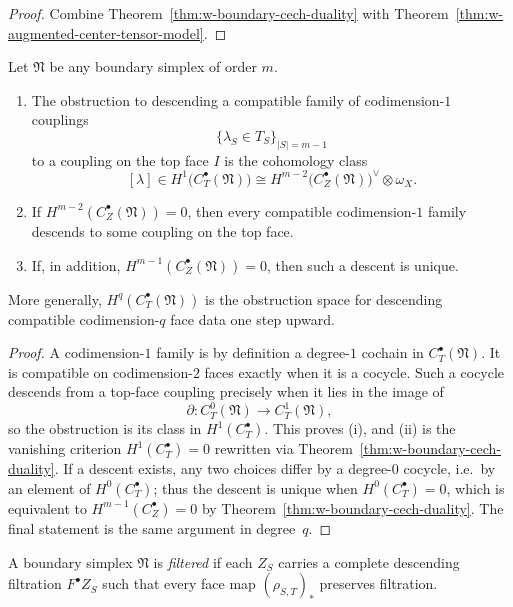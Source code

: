 \begin{proof}
Combine Theorem~\ref{thm:w-boundary-cech-duality} with
Theorem~\ref{thm:w-augmented-center-tensor-model}.
\end{proof}

\begin{theorem}
\label{thm:w-higher-mayer-vietoris-couplings}
Let $\mathfrak N$ be any boundary simplex of order $m$.
\begin{enumerate}[label=(\roman*)]
\item The obstruction to descending a compatible family of codimension-$1$ couplings
\[
\{\lambda_S\in T_S\}_{|S|=m-1}
\]
to a coupling on the top face $I$ is the cohomology class
\[
[\lambda]\in H^1\bigl(C_T^\bullet(\mathfrak N)\bigr)
\cong
H^{m-2}\bigl(C_Z^\bullet(\mathfrak N)\bigr)^\vee\otimes \omega_X.
\]
\item If $H^{m-2}(C_Z^\bullet(\mathfrak N))=0$, then every compatible codimension-$1$ family descends to
some coupling on the top face.
\item If, in addition, $H^{m-1}(C_Z^\bullet(\mathfrak N))=0$, then such a descent is unique.
\end{enumerate}
More generally, $H^q(C_T^\bullet(\mathfrak N))$ is the obstruction space for descending compatible
codimension-$q$ face data one step upward.
\end{theorem}

\begin{proof}
A codimension-$1$ family is by definition a degree-$1$ cochain in $C_T^\bullet(\mathfrak N)$. It is
compatible on codimension-$2$ faces exactly when it is a cocycle. Such a cocycle descends from a top-face
coupling precisely when it lies in the image of
\[
\partial\colon C_T^0(\mathfrak N)\to C_T^1(\mathfrak N),
\]
so the obstruction is its class in $H^1(C_T^\bullet)$. This proves (i), and (ii) is the vanishing criterion
$H^1(C_T^\bullet)=0$ rewritten via Theorem~\ref{thm:w-boundary-cech-duality}. If a descent exists, any two
choices differ by a degree-$0$ cocycle, i.e.\ by an element of $H^0(C_T^\bullet)$; thus the descent is unique
when $H^0(C_T^\bullet)=0$, which is equivalent to $H^{m-1}(C_Z^\bullet)=0$ by Theorem~\ref{thm:w-boundary-cech-duality}.
The final statement is the same argument in degree~$q$.
\end{proof}

\begin{definition}
\label{def:w-filtered-boundary-simplex}
A boundary simplex $\mathfrak N$ is \emph{filtered} if each $Z_S$ carries a complete descending filtration
$F^\bullet Z_S$ such that every face map $(\rho_{S,T})_*$ preserves filtration.
\end{definition}

